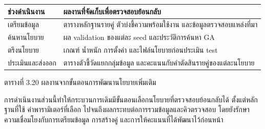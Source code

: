 \begin{center}\small
\begin{tabularx}{\linewidth}{p{3.4cm}X}
\toprule
ช่วงดำเนินงาน & ผลงานที่จัดเก็บเพื่อตรวจสอบย้อนกลับ \\
\midrule
เตรียมข้อมูล & ตารางหลักฐานรายคู่ ตัวบ่งชี้ความพร้อมใช้งาน และข้อมูลตรวจสอบแหล่งที่มา \\
ค้นหานโยบาย & ผล validation ของแต่ละ seed และประวัติการค้นหา GA \\
ตรึงนโยบาย & เกณฑ์ น้ำหนัก การตั้งค่า และไฟล์นโยบายก่อนประเมิน test \\
ประเมินและส่งออก & ตารางตัวชี้วัดแยกกลุ่มข้อมูล และคะแนนกับคำตัดสินรายคู่ของแต่ละนโยบาย \\
\bottomrule
\end{tabularx}
\par ตารางที่ 3.20 ผลงานจากขั้นตอนการพัฒนานโยบายเพิ่มเติม
\end{center}

การดำเนินงานส่วนนี้ทำให้กระบวนการเดิมมีขั้นตอนเลือกนโยบายที่ตรวจสอบย้อนกลับได้ ตั้งแต่หลักฐานที่ใช้ ค่าพารามิเตอร์ที่เลือก ไปจนถึงผลกระทบต่อการรวมข้อมูลและคิวตรวจสอบ โดยยังรักษาความเชื่อมโยงกับการเตรียมข้อมูล การสร้างคู่ และการให้คะแนนที่ได้พัฒนาไว้ก่อนหน้า

